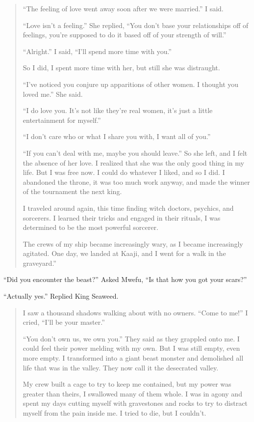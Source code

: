 \begin{quote}
``The feeling of love went away soon after we were married.'' I said.

``Love isn't a feeling.'' She replied, ``You don't base your relationships off of feelings, you're supposed to do it based off of your strength of will.''

``Alright.'' I said, ``I'll spend more time with you.''

So I did, I spent more time with her, but still she was distraught.

``I've noticed you conjure up apparitions of other women. I thought you loved me.'' She said.

``I do love you. It's not like they're real women, it's just a little entertainment for myself.''

``I don't care who or what I share you with, I want all of you.''

``If you can't deal with me, maybe you should leave.'' So she left, and I felt the absence of her love. I realized that she was the only good thing in my life. But I was free now. I could do whatever I liked, and so I did. I abandoned the throne, it was too much work anyway, and made the winner of the tournament the next king.

I traveled around again, this time finding witch doctors, psychics, and sorcerers. I learned their tricks and engaged in their rituals, I was determined to be the most powerful sorcerer.

The crews of my ship became increasingly wary, as I became increasingly agitated. One day, we landed at Kaaji, and I went for a walk in the graveyard.''
\end{quote}

``Did you encounter the beast?'' Asked Mwefu, ``Is that how you got your scars?''

``Actually yes.'' Replied King Seaweed.

\begin{quote}
I saw a thousand shadows walking about with no owners. ``Come to me!'' I cried, ``I'll be your master.''

``You don't own us, we own you.'' They said as they grappled onto me. I could feel their power melding with my own. But I was still empty, even more empty. I transformed into a giant beast monster and demolished all life that was in the valley. They now call it the desecrated valley.

My crew built a cage to try to keep me contained, but my power was greater than theirs, I swallowed many of them whole. I was in agony and spent my days cutting myself with gravestones and rocks to try to distract myself from the pain inside me. I tried to die, but I couldn't.
\end{quote}

